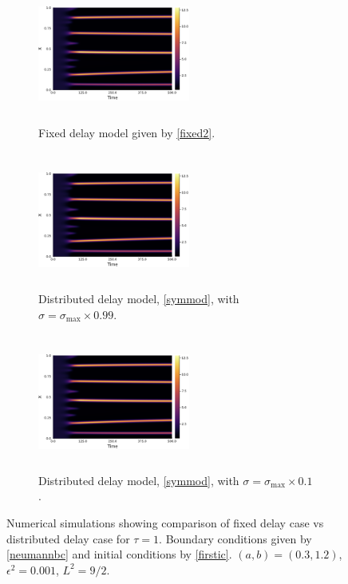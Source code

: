 \begin{figure}[H]
    \centering
    \begin{subfigure}[t]{0.32\textwidth}
        \centering
        \includegraphics[width=5cm,height=4.5cm]{dist2t1sigmax.png}
        \caption{Fixed delay model given by \eqref{fixed2}.}
        \label{}
    \end{subfigure}
    \hfill
    \begin{subfigure}[t]{0.32\textwidth}
        \centering
        \includegraphics[width=5cm,height=4.5cm]{dist2t1sigmax.png}
        \caption{Distributed delay model, \eqref{symmod}, with $\sigma=\sigma_{\max}\times0.99$.}
        \label{}
    \end{subfigure}
    \hfill
    \begin{subfigure}[t]{0.32\textwidth}
        \centering
        \includegraphics[width=5cm,height=4.5cm]{dist2t1sigmax.png}
        \caption{Distributed delay model, \eqref{symmod}, with $\sigma=\sigma_{\max}\times0.1$.}
        \label{}
    \end{subfigure}
    \caption{Numerical simulations showing comparison of fixed delay case vs distributed delay case for $\tau=1$. Boundary conditions given by \eqref{neumannbc} and initial conditions by \eqref{firstic}. $(a,b)=(0.3,1.2)$, $\epsilon^2=0.001$, $L^2=9/2$.}
    \label{fig:distres3}
\end{figure}
